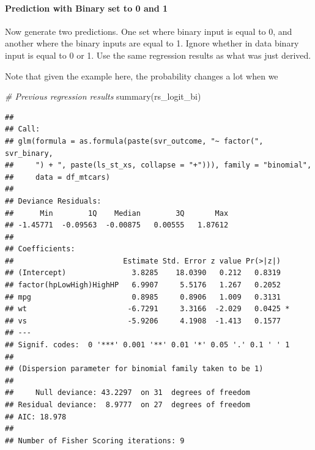 \documentclass[
]{book}
\newenvironment{Shaded}{\begin{snugshade}}{\end{snugshade}}
\newcommand{\CommentTok}[1]{\textcolor[rgb]{0.56,0.35,0.01}{\textit{#1}}}
\newcommand{\FunctionTok}[1]{\textcolor[rgb]{0.00,0.00,0.00}{#1}}
\newcommand{\NormalTok}[1]{#1}
\begin{document}
\hypertarget{prediction-with-binary-set-to-0-and-1}{%
\paragraph{Prediction with Binary set to 0 and 1}\label{prediction-with-binary-set-to-0-and-1}}

Now generate two predictions. One set where binary input is equal to 0, and another where the binary inputs are equal to 1. Ignore whether in data binary input is equal to 0 or 1. Use the same regression results as what was just derived.

Note that given the example here, the probability changes a lot when we

\begin{Shaded}
\begin{Highlighting}[]
\CommentTok{\# Previous regression results}
\FunctionTok{summary}\NormalTok{(rs\_logit\_bi)}
\end{Highlighting}
\end{Shaded}

\begin{verbatim}
## 
## Call:
## glm(formula = as.formula(paste(svr_outcome, "~ factor(", svr_binary, 
##     ") + ", paste(ls_st_xs, collapse = "+"))), family = "binomial", 
##     data = df_mtcars)
## 
## Deviance Residuals: 
##      Min        1Q    Median        3Q       Max  
## -1.45771  -0.09563  -0.00875   0.00555   1.87612  
## 
## Coefficients:
##                         Estimate Std. Error z value Pr(>|z|)  
## (Intercept)               3.8285    18.0390   0.212   0.8319  
## factor(hpLowHigh)HighHP   6.9907     5.5176   1.267   0.2052  
## mpg                       0.8985     0.8906   1.009   0.3131  
## wt                       -6.7291     3.3166  -2.029   0.0425 *
## vs                       -5.9206     4.1908  -1.413   0.1577  
## ---
## Signif. codes:  0 '***' 0.001 '**' 0.01 '*' 0.05 '.' 0.1 ' ' 1
## 
## (Dispersion parameter for binomial family taken to be 1)
## 
##     Null deviance: 43.2297  on 31  degrees of freedom
## Residual deviance:  8.9777  on 27  degrees of freedom
## AIC: 18.978
## 
## Number of Fisher Scoring iterations: 9
\end{verbatim}
\end{document}
